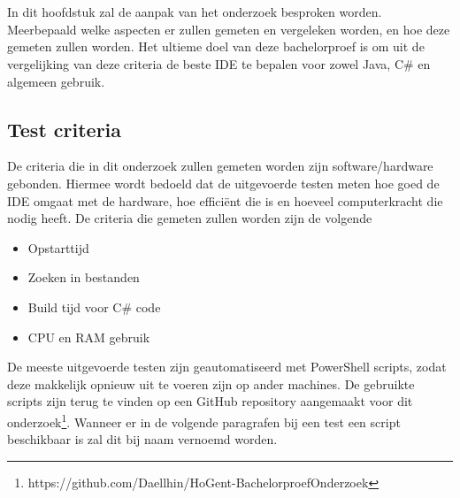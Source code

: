 \newcommand\verbatimOffset{-15pt}
\chapter{}
\label{ch:methodologie}


In dit hoofdstuk zal de aanpak van het onderzoek besproken worden. Meerbepaald welke aspecten er zullen gemeten en vergeleken worden, en hoe deze gemeten zullen worden. Het ultieme doel van deze bachelorproef is om uit de vergelijking van deze criteria de beste IDE te bepalen voor zowel Java, C\# en algemeen gebruik.

\section{Test criteria}
De criteria die in dit onderzoek zullen gemeten worden zijn software/hardware gebonden. Hiermee wordt bedoeld dat de uitgevoerde testen meten hoe goed de IDE omgaat met de hardware, hoe efficiënt die is en hoeveel computerkracht die nodig heeft. De criteria die gemeten zullen worden zijn de volgende

\begin{itemize}
	\item Opstarttijd
	\item Zoeken in bestanden
	\item Build tijd voor C\# code
	\item CPU en RAM gebruik
\end{itemize}

De meeste uitgevoerde testen zijn geautomatiseerd met PowerShell scripts, zodat deze makkelijk opnieuw uit te voeren zijn op ander machines. De gebruikte scripts zijn terug te vinden op een GitHub repository aangemaakt voor dit onderzoek\footnote{https://github.com/Daellhin/HoGent-BachelorproefOnderzoek}. Wanneer er in de volgende paragrafen bij een test een script beschikbaar is zal dit bij naam vernoemd worden.

